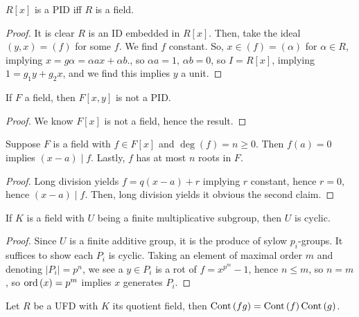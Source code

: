 \begin{theorem}
	\(R\left[ x \right] \) is a PID iff \(R\) is a field.
\end{theorem}
\begin{proof}
	It is clear \(R\) is an ID embedded in \(R\left[ x \right] \). Then, take the ideal \(\left( y, x \right) = \left( f \right) \) for some \(f\). We find \(f\) constant. So, \(x \in \left( f \right)  = \left( \alpha \right) \) for \(\alpha \in R\), implying \(x = g\alpha= \alpha ax + \alpha b\)., so \(\alpha a = 1\), \(\alpha b = 0\), so \(I = R\left[ x \right] \), implying \(1 = g_1 y + g_2 x\), and we find this implies \(y\) a unit.
\end{proof}
\begin{theorem}
	If \(F\) a field, then \(F\left[ x, y \right] \) is not a PID.
\end{theorem}
\begin{proof}
	We know \(F\left[ x \right] \) is not a field, hence the result.
\end{proof}
\begin{theorem}[FTA]
Suppose \(F\) is a field with \(f \in F\left[ x \right] \) 	and \(\deg \left( f \right)  = n\ge 0\). Then \(f\left( a \right) = 0\) implies \(\left( x- a \right) \mid f\). Lastly, \(f\) has at most \(n\) roots in \(F\).
\end{theorem}
\begin{proof}
	Long division yields \(f = q\left( x-a \right)  + r\) implying \(r\) constant, hence \(r = 0\), hence \(\left( x - a \right) \mid f\). Then, long division yields it obvious the second claim.
\end{proof}
\begin{theorem}
	If \(K\) is a field with \(U\) being a finite multiplicative subgroup, then \(U\) is cyclic.
\end{theorem}
\begin{proof}
	Since \(U\) is a finite additive group, it is the produce of sylow \(p_{i}\)-groups. It suffices to show each \(P_{i}\) is cyclic. Taking an element of maximal order \(m\) and denoting \(\left| P_{i} \right|= p^{n} \), we see a \(y \in P_{i}\) is a rot of \(f = x^{p^{m}} - 1\), hence \(n \le m\), so \(n = m\), so \(\operatorname{ord}\left( x \right)  = p^{m}\) implies \(x\) generates \(P_{i}\).
\end{proof}
\begin{theorem}
	Let \(R\) be a UFD with \(K\) its quotient field, then \(\operatorname{Cont}\left( fg \right) = \operatorname{Cont}\left( f \right) \operatorname{Cont}\left( g \right) \).
\end{theorem}
